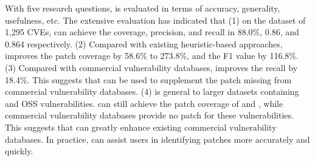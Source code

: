 \begin{abstract*}
With five research questions, \tool is evaluated in terms of accuracy, generality, usefulness, etc. The extensive evaluation has indicated that (1) on the dataset of 1,295 CVEs, \tool can achieve the coverage, precision, and recall in 88.0\%, 0.86, and 0.864 respectively. (2) Compared with existing heuristic-based approaches, \tool improves the patch coverage by 58.6\% to 273.8\%, and the F1 value by 116.8\%. (3) Compared with commercial vulnerability databases, \tool improves the recall by 18.4\%. This suggests that \tool can be used to supplement the patch missing from commercial vulnerability databases. (4) \tool is general to larger datasets containing  and  OSS vulnerabilities. \tool can still achieve the patch coverage of  and , while commercial vulnerability databases provide no patch for these vulnerabilities. This suggests that \tool can greatly enhance existing commercial vulnerability databases. In practice, \tool can assist users in identifying patches more accurately and quickly.
\end{abstract*}